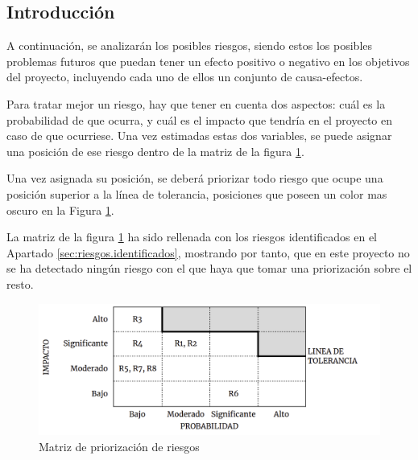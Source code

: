     \subsection{Introducción}
        A continuación, se analizarán los posibles riesgos, siendo estos los posibles problemas futuros que puedan tener un efecto positivo o negativo en los objetivos del proyecto, incluyendo cada uno de ellos un conjunto de causa-efectos.
        
        Para tratar mejor un riesgo, hay que tener en cuenta dos aspectos: cuál es la probabilidad de que ocurra, y cuál es el impacto que tendría en el proyecto en caso de que ocurriese.
        Una vez estimadas estas dos variables, se puede asignar una posición de ese riesgo dentro de la matriz de la figura \ref{fig:riskmatrix}.
        
        Una vez asignada su posición, se deberá priorizar todo riesgo que ocupe una posición superior a la línea de tolerancia, posiciones que poseen un color mas oscuro en la Figura \ref{fig:riskmatrix}.
        
        La matriz de la figura \ref{fig:riskmatrix} ha sido rellenada con los riesgos identificados en el Apartado \ref{sec:riesgos.identificados}, mostrando por tanto, que en este proyecto no se ha detectado ningún riesgo con el que haya que tomar una priorización sobre el resto.
        
        
        \begin{figure}[H]
            \centering
            \includegraphics[width=12cm]{./img/spm/risk.matrix.png}
            \caption{Matriz de priorización de riesgos}
            \label{fig:riskmatrix}
        \end{figure}

\newpage
